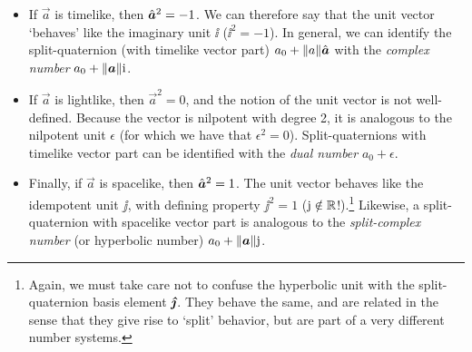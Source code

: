 \begin{itemize}
    \item If $\vec{a}$ is timelike, then $\uvec{a}^2 = -1$. We can therefore say that the unit vector `behaves' like the imaginary unit $\ii$ ($\ii^2 = -1$). In general, we can identify the split-quaternion (with timelike vector part) $ a_0 + \norm{a}\uvec{a}$ with the \emph{complex number} $a_0 + \norm{\vec{a}}\ii$. 
    \item If $\vec{a}$ is lightlike, then $\vec{a}^2 = 0$, and the notion of the unit vector is not well-defined. Because the vector is nilpotent with degree 2, it is analogous to the nilpotent unit $\epsilon$ (for which we have that $\epsilon^2 = 0$). Split-quaternions with timelike vector part can be identified with the \emph{dual number} $a_0 + \epsilon$. 
    \item Finally, if $\vec{a}$ is spacelike, then $\uvec{a}^2 = 1$. The unit vector behaves like the idempotent unit $\jj$, with defining property $\jj^2 = 1$ ($\mathrm{j} \notin \mathbb{R}$!).\footnote
        {Again, we must take care not to confuse the hyperbolic unit with the split-quaternion basis element $\quatj$. They behave the same, and are related in the sense that they give rise to `split' behavior, but are part of a very different number systems.}
        Likewise, a split-quaternion with spacelike vector part is analogous to the \emph{split-complex number} (or hyperbolic number) $a_0 + \norm{\vec{a}}\jj$.
\end{itemize}

